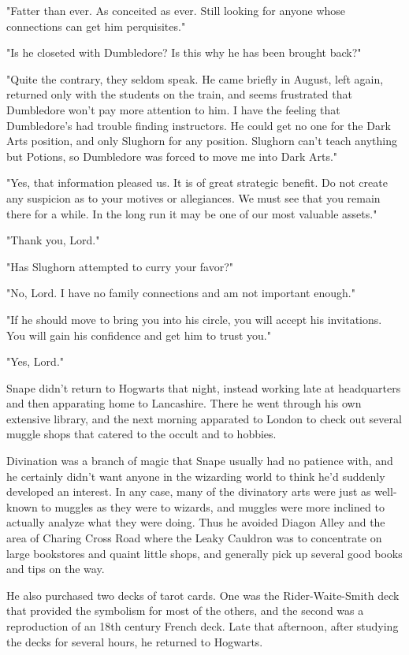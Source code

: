 \documentclass[a4paper,11pt]{article}
\begin{document}
"Fatter than ever. As conceited as ever. Still looking for anyone whose connections can get him perquisites."

"Is he closeted with Dumbledore? Is this why he has been brought back?"

"Quite the contrary, they seldom speak. He came briefly in August, left again, returned only with the students on the train, and seems frustrated that Dumbledore won't pay more attention to him. I have the feeling that Dumbledore's had trouble finding instructors. He could get no one for the Dark Arts position, and only Slughorn for any position. Slughorn can't teach anything but Potions, so Dumbledore was forced to move me into Dark Arts."

"Yes, that information pleased us. It is of great strategic benefit. Do not create any suspicion as to your motives or allegiances. We must see that you remain there for a while. In the long run it may be one of our most valuable assets."

"Thank you, Lord."

"Has Slughorn attempted to curry your favor?"

"No, Lord. I have no family connections and am not important enough."

"If he should move to bring you into his circle, you will accept his invitations. You will gain his confidence and get him to trust you."

"Yes, Lord."

Snape didn't return to Hogwarts that night, instead working late at headquarters and then apparating home to Lancashire. There he went through his own extensive library, and the next morning apparated to London to check out several muggle shops that catered to the occult and to hobbies.

Divination was a branch of magic that Snape usually had no patience with, and he certainly didn't want anyone in the wizarding world to think he'd suddenly developed an interest. In any case, many of the divinatory arts were just as well-known to muggles as they were to wizards, and muggles were more inclined to actually analyze what they were doing. Thus he avoided Diagon Alley and the area of Charing Cross Road where the Leaky Cauldron was to concentrate on large bookstores and quaint little shops, and generally pick up several good books and tips on the way.

He also purchased two decks of tarot cards. One was the Rider-Waite-Smith deck that provided the symbolism for most of the others, and the second was a reproduction of an 18th century French deck. Late that afternoon, after studying the decks for several hours, he returned to Hogwarts.
\end{document}
